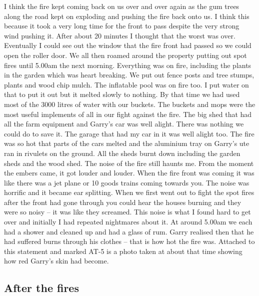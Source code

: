 \documentclass[a4paper]{article}
\begin{document}
        I think the fire kept coming back on us over and over again as the gum trees along the road kept on exploding and pushing the fire back onto us. I think this because it took a very long time for the front to pass despite the very strong wind pushing it. After about 20 minutes I thought that the worst was over.
        Eventually I could see out the window that the fire front had passed so we could open the roller door. We all then roamed around the property putting out spot fires until 5.00am the next morning. Everything was on fire, including the plants in the garden which was heart breaking. We put out fence posts and tree stumps, plants and wood chip mulch. The inflatable pool was on fire too. I put water on that to put it out but it melted slowly to nothing. By that time we had used most of the 3000 litres of water with our buckets. The buckets and mops were the most useful implements of all in our fight against the fire.
        The big shed that had all the farm equipment and Garry's car was well alight. There was nothing we could do to save it. The garage that had my car in it was well alight too. The fire was so hot that parts of the cars melted and the aluminium tray on Garry's ute ran in rivulets on the ground. All the sheds burnt down including the garden sheds and the wood shed.
        The noise of the fire still haunts me. From the moment the embers came, it got louder and louder. When the fire front was coming it was like there was a jet plane or 10 goods trains coming towards you. The noise was horrific and it became ear splitting. When we first went out to fight the spot fires after the front had gone through you could hear the houses burning and they were so noisy – it was like they screamed. This noise is what I found hard to get over and initially I had repeated nightmares about it.
        At around 5.00am we each had a shower and cleaned up and had a glass of rum. Garry realised then that he had suffered burns through his clothes – that is how hot the fire was. Attached to this statement and marked AT-5 is a photo taken at about that time showing how red Garry's skin had become.

    \subsection{After the fires}
\end{document}
